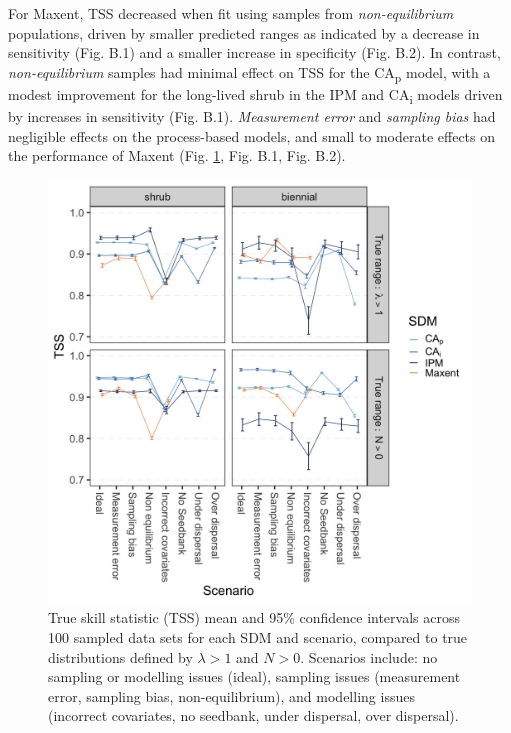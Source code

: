 \documentclass[preprint,review,times,12pt]{elsarticle}
\begin{document}
For Maxent, TSS decreased when fit using samples from \emph{non-equilibrium} populations, driven by smaller predicted ranges as indicated by a decrease in sensitivity (Fig. B.1) and a smaller increase in specificity (Fig. B.2). In contrast, \emph{non-equilibrium} samples had minimal effect on TSS for the CA\textsubscript{p} model, with a modest improvement for the long-lived shrub in the IPM and CA\textsubscript{i} models driven by increases in sensitivity (Fig. B.1). \emph{Measurement error} and \emph{sampling bias} had negligible effects on the process-based models, and small to moderate effects on the performance of Maxent (Fig. \ref{fig:TSSmn}, Fig. B.1, Fig. B.2). 


\begin{figure}
	\centering\includegraphics[width=5in]{figs/fig_TSS_mn+CI.jpg}
	\caption{\label{fig:TSSmn} True skill statistic (TSS) mean and 95\% confidence intervals across 100 sampled data sets for each SDM and scenario, compared to true distributions defined by $\lambda > 1$ and $N > 0$. Scenarios include: no sampling or modelling issues (ideal), sampling issues (measurement error, sampling bias, non-equilibrium), and modelling issues (incorrect covariates, no seedbank, under dispersal, over dispersal).}
\end{figure}
\end{document}
